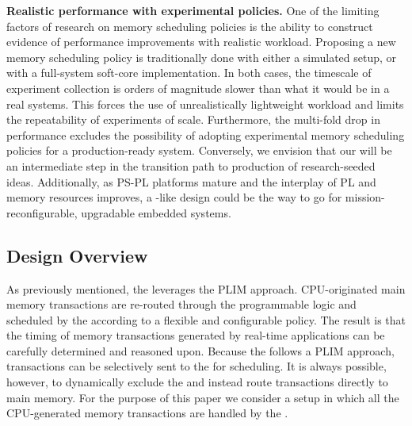 \par{\bf Realistic performance with experimental policies.} One of the
limiting factors of research on memory scheduling policies is the
ability to construct evidence of performance improvements with
realistic workload. Proposing a new memory scheduling policy is
traditionally done with either a simulated setup, or with a
full-system soft-core implementation. In both cases, the timescale of
experiment collection is orders of magnitude slower than what it would
be in a real systems. This forces the use of unrealistically
lightweight workload and limits the repeatability of experiments of
scale. Furthermore, the multi-fold drop in performance excludes the
possibility of adopting experimental memory scheduling policies for a
production-ready system. Conversely, we envision that our \schim will
be an intermediate step in the transition path to production of
research-seeded ideas. Additionally, as PS-PL platforms mature and the
interplay of PL and memory resources improves, a \schim-like design
could be the way to go for mission-reconfigurable, upgradable embedded
systems.

\subsection{Design Overview}
As previously mentioned, the \schim leverages the PLIM
approach. CPU-originated main memory transactions are re-routed
through the programmable logic and scheduled by the \schim according
to a flexible and configurable policy. The result is that the timing
of memory transactions generated by real-time applications can be
carefully determined and reasoned upon. Because the \schim follows a
PLIM approach, transactions can be selectively sent to the \schim for
scheduling. It is always possible, however, to dynamically exclude the
\schim and instead route transactions directly to main memory. For the
purpose of this paper we consider a setup in which all the
CPU-generated memory transactions are handled by the \schim.



